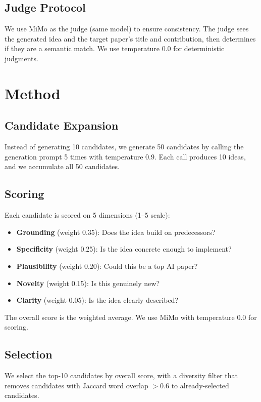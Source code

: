\documentclass[conference]{IEEEtran}
\begin{document}
\subsection{Judge Protocol}

We use MiMo as the judge (same model) to ensure consistency. The judge sees the generated idea and the target paper's title and contribution, then determines if they are a semantic match. We use temperature 0.0 for deterministic judgments.

\section{Method}

\subsection{Candidate Expansion}

Instead of generating 10 candidates, we generate 50 candidates by calling the generation prompt 5 times with temperature 0.9. Each call produces 10 ideas, and we accumulate all 50 candidates.

\subsection{Scoring}

Each candidate is scored on 5 dimensions (1--5 scale):
\begin{itemize}
    \item \textbf{Grounding} (weight 0.35): Does the idea build on predecessors?
    \item \textbf{Specificity} (weight 0.25): Is the idea concrete enough to implement?
    \item \textbf{Plausibility} (weight 0.20): Could this be a top AI paper?
    \item \textbf{Novelty} (weight 0.15): Is this genuinely new?
    \item \textbf{Clarity} (weight 0.05): Is the idea clearly described?
\end{itemize}

The overall score is the weighted average. We use MiMo with temperature 0.0 for scoring.

\subsection{Selection}

We select the top-10 candidates by overall score, with a diversity filter that removes candidates with Jaccard word overlap $> 0.6$ to already-selected candidates.
\end{document}
